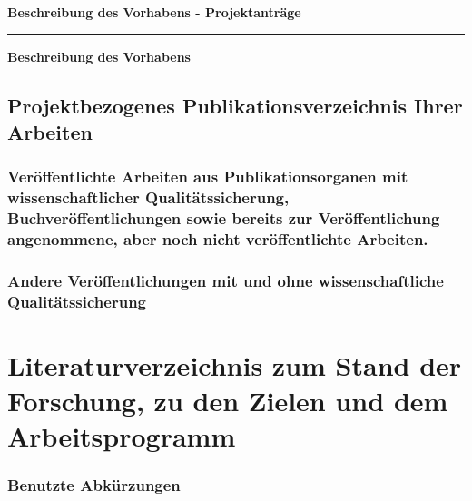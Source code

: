 \documentclass[11pt,DIV=16,parskip=half]{scrartcl}
\begin{document}
\textbf{Beschreibung des Vorhabens - Projektanträge}
\vspace{2em}

\textbf{\theApplicants}
\vspace{1em}

\textbf{\thetitle}

\vspace{1em}
\hrule
\vspace{1em}

\textbf{\Large Beschreibung des Vorhabens}



\subsection{Projektbezogenes Publikationsverzeichnis Ihrer Arbeiten}
\subsubsection{Veröffentlichte Arbeiten aus Publikationsorganen mit wissenschaftlicher Qualitätssicherung, Buchveröffentlichungen sowie bereits zur Veröffentlichung angenommene, aber noch nicht veröffentlichte Arbeiten.}

\printbibliography[keyword=own,heading=none,resetnumbers=true]

\subsubsection{Andere Veröffentlichungen mit und ohne wissenschaftliche Qualitätssicherung}

\printbibliography[keyword=ownpreprint,heading=none,resetnumbers=true]







\section{Literaturverzeichnis zum Stand der Forschung, zu den Zielen und dem Arbeitsprogramm}

\resetboldbibnames
\newrefcontext
{}
\printbibliography[heading=none,notkeyword=own,notkeyword=ownpreprint,resetnumbers=true]



\subsubsection{Benutzte Abkürzungen}




\end{document}
